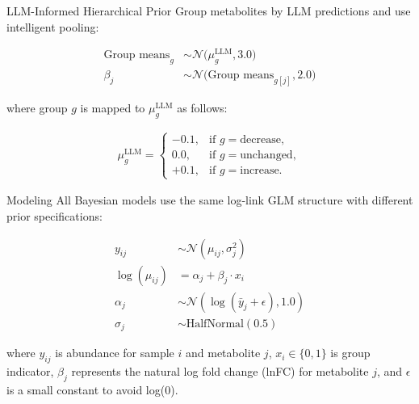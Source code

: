\documentclass[
  ignorenonframetext,
  aspectratio=169,
]{beamer}
\begin{document}
\begin{frame}{LLM-Informed Hierarchical Prior}
\label{llm-informed-hierarchical-prior}
Group metabolites by LLM predictions and use intelligent pooling:

\begin{align*}
\text{Group means}_g &\sim \mathcal{N}\bigl(\mu_g^{\mathrm{LLM}}, 3.0\bigr) \\
\beta_j &\sim \mathcal{N}\bigl(\text{Group means}_{g[j]}, 2.0\bigr)
\end{align*}

where group \(g\) is mapped to \(\mu_g^{\mathrm{LLM}}\) as follows:

\begin{align*}
\mu_g^{\mathrm{LLM}} =
\begin{cases}
-0.1, & \text{if }g = \text{decrease},\\
0.0,  & \text{if }g = \text{unchanged},\\
+0.1, & \text{if }g = \text{increase}.
\end{cases}
\end{align*}
\end{frame}

\begin{frame}{Modeling}
\label{modeling}
All Bayesian models use the same log-link GLM structure with different
prior specifications:

\begin{align}
y_{ij} &\sim \mathcal{N}(\mu_{ij}, \sigma_j^2) \\
\log(\mu_{ij}) &= \alpha_j + \beta_j \cdot x_i \\
\alpha_j &\sim \mathcal{N}(\log(\bar{y}_j + \epsilon), 1.0) \\
\sigma_j &\sim \text{HalfNormal}(0.5)
\end{align}

where \(y_{ij}\) is abundance for sample \(i\) and metabolite \(j\),
\(x_i \in \{0,1\}\) is group indicator, \(\beta_j\) represents the
natural log fold change (lnFC) for metabolite \(j\), and \(\epsilon\) is
a small constant to avoid log(0).
\end{frame}
\end{document}
